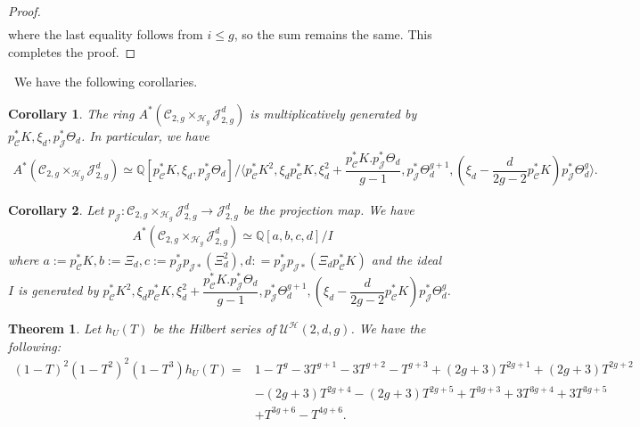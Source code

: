 \documentclass[11pt]{amsart}
\newtheorem{theorem}{Theorem}[section]
\newtheorem{definition}{Definition}[subsection]
\newtheorem{corollary}{Corollary}[theorem]
\theoremstyle{definition}
\newcommand{\ri}{\rightarrow}
\newcommand{\J}{\mathscr{J}}
\newcommand{\jac}{\mathcal{J}}
\newcommand{\h}{\mathcal{H}}
\newcommand{\mcalu}{\mathcal{U}}
\newcommand{\Q}{\mathbb{Q}}
\newcommand{\mC}{\mathcal{C}}
\newcommand{\T}{\Theta}
\begin{document}
\begin{proof}
\begin{equation*}
\begin{aligned}
    \end{aligned}
\end{equation*}where the last equality follows from $i\leq g$, so the sum remains the same. This completes the proof. 
\end{proof}\
We have the following corollaries.
\begin{corollary}\label{cor:c-j}
  The ring $A^*(\mC_{2,g}\times_{\h_g}\jac^d_{2,g})$ is multiplicatively generated by $p_\mC^*K, \xi_d, p_\jac^*\T_d$. In particular, we have
    \begin{align*}
      A^*(\mC_{2,g}\times_{\h_g}\jac^d_{2,g})\simeq \Q[p_\mC^*K, \xi_d, p_\jac^*\T_d] / \langle p_\mC^*K^2, \xi_d p_\mC^*K, \xi_d^2+\dfrac{p_\mC^*K.p_\jac^*\T_d}{g-1}, p_\jac^*\T_d^{g+1},
	  (\xi_d-\dfrac{d}{2g-2}p_\mC^*K)p_\jac^*\T_d^{g} \rangle .
    \end{align*}
\end{corollary}
\begin{corollary}
    Let $p_\jac: \mC_{2,g}\times_{\h_g}\J^d_{2,g}\ri \J^d_{2,g}$ be the projection map. We have
    \begin{align*}A^*(\mC_{2,g}\times_{\h_g}\J^d_{2,g})\simeq \Q[a,b ,c ,d]/I\end{align*}
    where $a:= p_\mC^*K, b:= \Xi_d,c:= p_\J^*p_{\J *}(\Xi_d^2),d: = p_\J^*p_{\J *}(\Xi_dp_\mC^*K)$ and the ideal\\
     $I$ is generated by
    $p_\mC^*K^2, \xi_d p_\mC^*K, \xi_d^2+\dfrac{p_\mC^*K.p_\J^*\T_d}{g-1}, p_\J^*\T_d^{g+1},(\xi_d-\dfrac{d}{2g-2}p_\mC^*K)p_\J^*\T_d^{g}$.
\end{corollary}
\begin{theorem}\label{thm:hilb-stable-denom}
Let $h_U(T)$ be the Hilbert series of $\mcalu^\h(2,d,g)$. We have the following:
\begin{equation} \begin{aligned}
(1-T)^2(1-T^2)^2(1-T^3)h_U(T) =& 1 - T^g - 3T^{g+1} - 3T^{g+2} - T^{g+3}+ (2g+3)T^{2g+1} + (2g+3)T^{2g+2}\\
&- (2g+3)T^{2g+4} - (2g+3)T^{2g+5}+ T^{3g+3} + 3T^{3g+4} + 3T^{3g+5}\\& + T^{3g+6}- T^{4g+6}. \end{aligned}
\end{equation}
\end{theorem}
\end{document}
